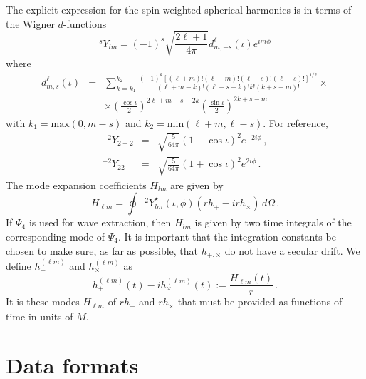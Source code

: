 \documentclass{article}
\numberwithin{equation}{section}
\newcommand{\Ys}{{{}^sY}}
\newcommand{\Ytwo}{{{}^{-2}Y}}
\begin{document}
The explicit expression for the spin weighted spherical harmonics is
in terms of the Wigner $d$-functions
\begin{equation}
  \label{eq:5}
   \Ys_{lm} = (-1)^s\sqrt{\frac{2\ell+1}{4\pi}} d^\ell_{m,-s}(\iota)e^{im\phi}
\end{equation}
where
\begin{eqnarray}
  \label{eq:6}
  d^\ell_{m,s}(\iota) &=& \sum_{k = k_1}^{k_2}
    \frac{(-1)^k[(\ell+m)!(\ell-m)!(\ell+s)!(\ell-s)!]^{1/2}}{(\ell +m
      -k)!(\ell-s-k)!k!(k+s-m)!} \times \\ 
    &&\times \left(\frac{\cos\iota}{2}\right)^{2\ell+m-s-2k}\left(\frac{\sin\iota}{2}\right)^{2k+s-m}  
\end{eqnarray}
with $k_1 = \textrm{max}(0, m-s)$ and $k_2=\textrm{min}(\ell+m,
\ell-s)$.  For reference,
\begin{eqnarray}
  \label{eq:7}
  \Ytwo_{2-2} &=& \sqrt{\frac{5}{64\pi}}(1-\cos\iota)^2e^{-2i\phi}\,, \\
  \Ytwo_{22} &=& \sqrt{\frac{5}{64\pi}}(1+\cos\iota)^2e^{2i\phi} \,.
\end{eqnarray}
The mode expansion coefficients $H_{lm}$ are given by
\begin{equation}
  \label{eq:10}
  H_{\ell m} = \oint \Ytwo_{lm}^\star(\iota,\phi)(rh_+-irh_\times )\,d\Omega\,.
\end{equation}
If $\Psi_4$ is used for wave extraction, then $H_{lm}$ is given by two
time integrals of the corresponding mode of $\Psi_4$.  It is important
that the integration constants be chosen to make sure, as far as
possible, that $h_{+,\times}$ do not have a secular drift. 
We define $h_+^{(\ell m)}$ and $h_\times^{(\ell m)}$ as
\begin{equation}
  \label{eq:11}
  h_+^{(\ell m)}(t) -ih_\times^{(\ell m)}(t) := \frac{H_{\ell m}(t)}{r}\,.  
\end{equation}
It is these modes $H_{\ell m}$ of $rh_+$ and $rh_\times$ that must be
provided as functions of time in units of $M$.




\section{Data formats}
\label{sec:format}
\end{document}
